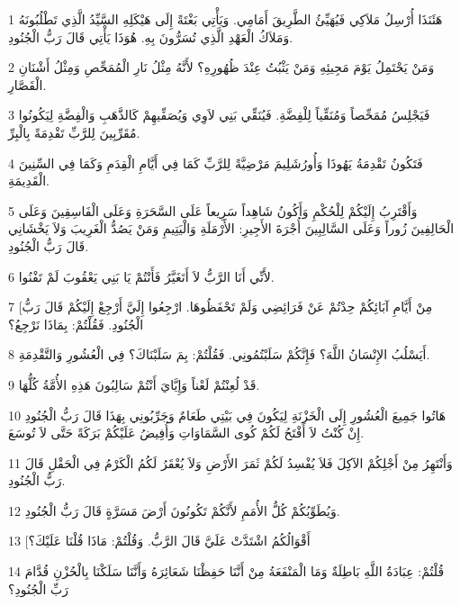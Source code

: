 \par 1 هَئَنَذَا أُرْسِلُ مَلاَكِي فَيُهَيِّئُ الطَّرِيقَ أَمَامِي. وَيَأْتِي بَغْتَةً إِلَى هَيْكَلِهِ السَّيِّدُ الَّذِي تَطْلُبُونَهُ وَمَلاَكُ الْعَهْدِ الَّذِي تُسَرُّونَ بِهِ. هُوَذَا يَأْتِي قَالَ رَبُّ الْجُنُودِ.
\par 2 وَمَنْ يَحْتَمِلُ يَوْمَ مَجِيئِهِ وَمَنْ يَثْبُتُ عِنْدَ ظُهُورِهِ؟ لأَنَّهُ مِثْلُ نَارِ الْمُمَحِّصِ وَمِثْلُ أَشْنَانِ الْقَصَّارِ.
\par 3 فَيَجْلِسُ مُمَحِّصاً وَمُنَقِّياً لِلْفِضَّةِ. فَيُنَقِّي بَنِي لاَوِي وَيُصَفِّيهِمْ كَالذَّهَبِ وَالْفِضَّةِ لِيَكُونُوا مُقَرِّبِينَ لِلرَّبِّ تَقْدِمَةً بِالْبِرِّ.
\par 4 فَتَكُونُ تَقْدِمَةُ يَهُوذَا وَأُورُشَلِيمَ مَرْضِيَّةً لِلرَّبِّ كَمَا فِي أَيَّامِ الْقِدَمِ وَكَمَا فِي السِّنِينَ الْقَدِيمَةِ.
\par 5 وَأَقْتَرِبُ إِلَيْكُمْ لِلْحُكْمِ وَأَكُونُ شَاهِداً سَرِيعاً عَلَى السَّحَرَةِ وَعَلَى الْفَاسِقِينَ وَعَلَى الْحَالِفِينَ زُوراً وَعَلَى السَّالِبِينَ أُجْرَةَ الأَجِيرِ: الأَرْمَلَةِ وَالْيَتِيمِ وَمَنْ يَصُدُّ الْغَرِيبَ وَلاَ يَخْشَانِي قَالَ رَبُّ الْجُنُودِ.
\par 6 لأَنِّي أَنَا الرَّبُّ لاَ أَتَغَيَّرُ فَأَنْتُمْ يَا بَنِي يَعْقُوبَ لَمْ تَفْنُوا.
\par 7 [مِنْ أَيَّامِ آبَائِكُمْ حِدْتُمْ عَنْ فَرَائِضِي وَلَمْ تَحْفَظُوهَا. ارْجِعُوا إِلَيَّ أَرْجِعْ إِلَيْكُمْ قَالَ رَبُّ الْجُنُودِ. فَقُلْتُمْ: بِمَاذَا نَرْجِعُ؟
\par 8 أَيَسْلُبُ الإِنْسَانُ اللَّهَ؟ فَإِنَّكُمْ سَلَبْتُمُونِي. فَقُلْتُمْ: بِمَ سَلَبْنَاكَ؟ فِي الْعُشُورِ وَالتَّقْدِمَةِ.
\par 9 قَدْ لُعِنْتُمْ لَعْناً وَإِيَّايَ أَنْتُمْ سَالِبُونَ هَذِهِ الأُمَّةُ كُلُّهَا.
\par 10 هَاتُوا جَمِيعَ الْعُشُورِ إِلَى الْخَزْنَةِ لِيَكُونَ فِي بَيْتِي طَعَامٌ وَجَرِّبُونِي بِهَذَا قَالَ رَبُّ الْجُنُودِ إِنْ كُنْتُ لاَ أَفْتَحُ لَكُمْ كُوى السَّمَاوَاتِ وَأُفِيضُ عَلَيْكُمْ بَرَكَةً حَتَّى لاَ تُوسَعَ.
\par 11 وَأَنْتَهِرُ مِنْ أَجْلِكُمْ الآكِلَ فَلاَ يُفْسِدُ لَكُمْ ثَمَرَ الأَرْضِ وَلاَ يُعْقَرُ لَكُمُ الْكَرْمُ فِي الْحَقْلِ قَالَ رَبُّ الْجُنُودِ.
\par 12 وَيُطَوِّبُكُمْ كُلُّ الأُمَمِ لأَنَّكُمْ تَكُونُونَ أَرْضَ مَسَرَّةٍ قَالَ رَبُّ الْجُنُودِ.
\par 13 [أَقْوَالُكُمُ اشْتَدَّتْ عَلَيَّ قَالَ الرَّبُّ. وَقُلْتُمْ: مَاذَا قُلْنَا عَلَيْكَ؟
\par 14 قُلْتُمْ: عِبَادَةُ اللَّهِ بَاطِلَةٌ وَمَا الْمَنْفَعَةُ مِنْ أَنَّنَا حَفِظْنَا شَعَائِرَهُ وَأَنَّنَا سَلَكْنَا بِالْحُزْنِ قُدَّامَ رَبِّ الْجُنُودِ؟
